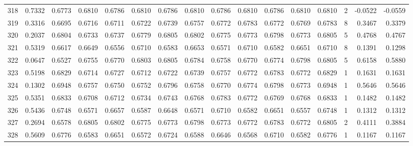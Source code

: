 \begin{tabular}{lrrrrrrrrrrrrrrr}
318 &      0.7332 &  0.6773 &  0.6810 &  0.6786 &  0.6810 &  0.6786 &  0.6810 &  0.6786 &  0.6810 &  0.6786 &   0.6810 &     0.6810 &      2 &                   -0.0522 &                    -0.0559 \\
319 &      0.3316 &  0.6695 &  0.6716 &  0.6711 &  0.6722 &  0.6739 &  0.6757 &  0.6772 &  0.6783 &  0.6772 &   0.6769 &     0.6783 &      8 &                    0.3467 &                     0.3379 \\
320 &      0.2037 &  0.6804 &  0.6733 &  0.6737 &  0.6779 &  0.6805 &  0.6802 &  0.6775 &  0.6773 &  0.6798 &   0.6773 &     0.6805 &      5 &                    0.4768 &                     0.4767 \\
321 &      0.5319 &  0.6617 &  0.6649 &  0.6556 &  0.6710 &  0.6583 &  0.6653 &  0.6571 &  0.6710 &  0.6582 &   0.6651 &     0.6710 &      8 &                    0.1391 &                     0.1298 \\
322 &      0.0647 &  0.6527 &  0.6755 &  0.6770 &  0.6803 &  0.6805 &  0.6784 &  0.6758 &  0.6770 &  0.6774 &   0.6798 &     0.6805 &      5 &                    0.6158 &                     0.5880 \\
323 &      0.5198 &  0.6829 &  0.6714 &  0.6727 &  0.6712 &  0.6722 &  0.6739 &  0.6757 &  0.6772 &  0.6783 &   0.6772 &     0.6829 &      1 &                    0.1631 &                     0.1631 \\
324 &      0.1302 &  0.6948 &  0.6757 &  0.6750 &  0.6752 &  0.6796 &  0.6758 &  0.6770 &  0.6774 &  0.6798 &   0.6773 &     0.6948 &      1 &                    0.5646 &                     0.5646 \\
325 &      0.5351 &  0.6833 &  0.6708 &  0.6712 &  0.6734 &  0.6743 &  0.6768 &  0.6783 &  0.6772 &  0.6769 &   0.6768 &     0.6833 &      1 &                    0.1482 &                     0.1482 \\
326 &      0.5436 &  0.6748 &  0.6571 &  0.6657 &  0.6587 &  0.6648 &  0.6571 &  0.6710 &  0.6582 &  0.6651 &   0.6557 &     0.6748 &      1 &                    0.1312 &                     0.1312 \\
327 &      0.2694 &  0.6578 &  0.6805 &  0.6802 &  0.6775 &  0.6773 &  0.6798 &  0.6773 &  0.6772 &  0.6783 &   0.6772 &     0.6805 &      2 &                    0.4111 &                     0.3884 \\
328 &      0.5609 &  0.6776 &  0.6583 &  0.6651 &  0.6572 &  0.6724 &  0.6588 &  0.6646 &  0.6568 &  0.6710 &   0.6582 &     0.6776 &      1 &                    0.1167 &                     0.1167 \\

\end{tabular}
